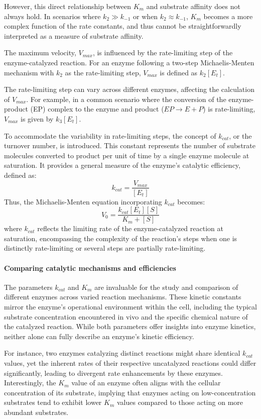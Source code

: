 However, this direct relationship between $K_m$ and substrate affinity does not always hold. 
In scenarios where $k_2 \gg k_{-1}$ or when $k_2 \approx k_{-1}$, $K_m$ becomes a more complex 
function of the rate constants, and thus cannot be straightforwardly interpreted as a measure of 
substrate affinity.

The maximum velocity, $V_{max}$, is influenced by the rate-limiting step of the enzyme-catalyzed reaction. 
For an enzyme following a two-step Michaelis-Menten mechanism with $k_2$ as the rate-limiting step, 
$V_{max}$ is defined as $k_2[E_t]$.

The rate-limiting step can vary across different enzymes, affecting the calculation of $V_{max}$. 
For example, in a common scenario where the conversion of the enzyme-product (EP) complex to the 
enzyme and product ($EP \rightarrow E + P$) is rate-limiting, $V_{max}$ is given by $k_3[E_t]$.

To accommodate the variability in rate-limiting steps, the concept of $k_{cat}$, or the turnover 
number, is introduced. This constant represents the number of substrate molecules converted to 
product per unit of time by a single enzyme molecule at saturation. It provides a general measure 
of the enzyme's catalytic efficiency, defined as:
$$
k_{cat} = \frac{V_{max}}{[E_t]}
$$
Thus, the Michaelis-Menten equation incorporating $k_{cat}$ becomes:
$$
V_0 = \frac{k_{cat}[E_t][S]}{K_m + [S]}
$$
where $k_{cat}$ reflects the limiting rate of the enzyme-catalyzed reaction at saturation, 
encompassing the complexity of the reaction's steps when one is distinctly rate-limiting or several 
steps are partially rate-limiting.

\paragraph{Comparing catalytic mechanisms and efficiencies}
The parameters $k_{cat}$ and $K_m$ are invaluable for the study and comparison of different enzymes 
across varied reaction mechanisms. These kinetic constants mirror the enzyme's operational 
environment within the cell, including the typical substrate concentration encountered in vivo 
and the specific chemical nature of the catalyzed reaction. While both parameters offer insights 
into enzyme kinetics, neither alone can fully describe an enzyme's kinetic efficiency. 

For instance, two enzymes catalyzing distinct reactions might share identical $k_{cat}$ values, 
yet the inherent rates of their respective uncatalyzed reactions could differ significantly, 
leading to divergent rate enhancements by these enzymes. Interestingly, the $K_m$ value of an 
enzyme often aligns with the cellular concentration of its substrate, implying that enzymes acting 
on low-concentration substrates tend to exhibit lower $K_m$ values compared to those acting on more 
abundant substrates.

